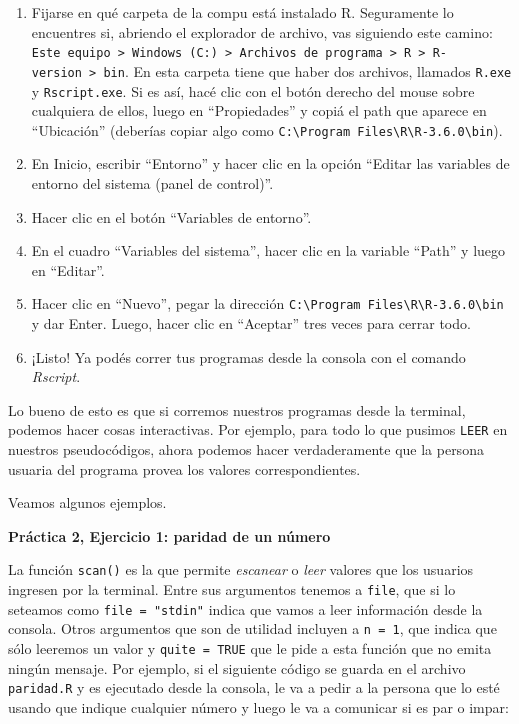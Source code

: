\documentclass[
]{book}
\providecommand{\tightlist}{%
  \setlength{\itemsep}{0pt}\setlength{\parskip}{0pt}}
\begin{document}
\begin{enumerate}
\def\labelenumi{\arabic{enumi}.}
\tightlist
\item
  Fijarse en qué carpeta de la compu está instalado R. Seguramente lo encuentres si, abriendo el explorador de archivo, vas siguiendo este camino: \texttt{Este\ equipo\ \textgreater{}\ Windows\ (C:)\ \textgreater{}\ Archivos\ de\ programa\ \textgreater{}\ R\ \textgreater{}\ R-version\ \textgreater{}\ bin}. En esta carpeta tiene que haber dos archivos, llamados \texttt{R.exe} y \texttt{Rscript.exe}. Si es así, hacé clic con el botón derecho del mouse sobre cualquiera de ellos, luego en ``Propiedades'' y copiá el path que aparece en ``Ubicación'' (deberías copiar algo como \texttt{C:\textbackslash{}Program\ Files\textbackslash{}R\textbackslash{}R-3.6.0\textbackslash{}bin}).
\item
  En Inicio, escribir ``Entorno'' y hacer clic en la opción ``Editar las variables de entorno del sistema (panel de control)''.
\item
  Hacer clic en el botón ``Variables de entorno''.
\item
  En el cuadro ``Variables del sistema'', hacer clic en la variable ``Path'' y luego en ``Editar''.
\item
  Hacer clic en ``Nuevo'', pegar la dirección \texttt{C:\textbackslash{}Program\ Files\textbackslash{}R\textbackslash{}R-3.6.0\textbackslash{}bin} y dar Enter. Luego, hacer clic en ``Aceptar'' tres veces para cerrar todo.
\item
  ¡Listo! Ya podés correr tus programas desde la consola con el comando \emph{Rscript}.
\end{enumerate}

Lo bueno de esto es que si corremos nuestros programas desde la terminal, podemos hacer cosas interactivas. Por ejemplo, para todo lo que pusimos \texttt{LEER} en nuestros pseudocódigos, ahora podemos hacer verdaderamente que la persona usuaria del programa provea los valores correspondientes.

Veamos algunos ejemplos.

\textbf{Práctica 2, Ejercicio 1: paridad de un número}

La función \texttt{scan()} es la que permite \emph{escanear} o \emph{leer} valores que los usuarios ingresen por la terminal. Entre sus argumentos tenemos a \texttt{file}, que si lo seteamos como \texttt{file\ =\ "stdin"} indica que vamos a leer información desde la consola. Otros argumentos que son de utilidad incluyen a \texttt{n\ =\ 1}, que indica que sólo leeremos un valor y \texttt{quite\ =\ TRUE} que le pide a esta función que no emita ningún mensaje. Por ejemplo, si el siguiente código se guarda en el archivo \texttt{paridad.R} y es ejecutado desde la consola, le va a pedir a la persona que lo esté usando que indique cualquier número y luego le va a comunicar si es par o impar:
\end{document}

